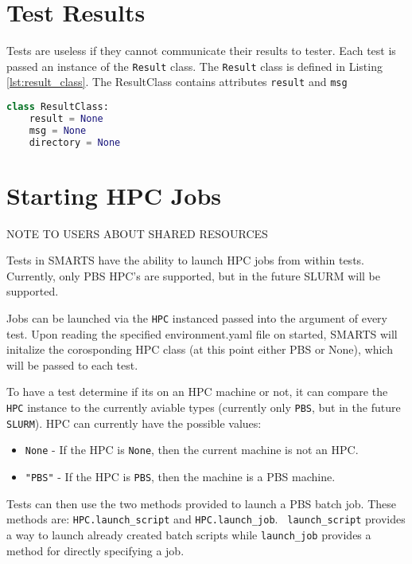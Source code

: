 \section{Test Results}
\label{sec:results}

Tests are useless if they cannot communicate their results to tester. Each test
is passed an instance of the {\tt Result} class. The {\tt Result} class is
defined in Listing \ref{lst:result_class}. The ResultClass contains attributes
{\tt result} and {\tt msg}

\begin{lstlisting}[language=Python, 
                   caption={Result class definition},
                   label={lst:result_class}]
class ResultClass:
    result = None
    msg = None
    directory = None
\end{lstlisting}

\section{Starting HPC Jobs}
\label{sec:hpc_jobs}

NOTE TO USERS ABOUT SHARED RESOURCES

Tests in SMARTS have the ability to launch HPC jobs from within tests.
Currently, only PBS HPC's are supported, but in the future SLURM will be
supported.

Jobs can be launched via the {\tt HPC} instanced passed into the argument of
every test. Upon reading the specified environment.yaml file on started, SMARTS
will initalize the corosponding HPC class (at this point either PBS or None),
which will be passed to each test.

To have a test determine if its on an HPC machine or not, it can compare the
{\tt HPC} instance to the currently aviable types (currently only {\tt PBS},
but in the future {\tt SLURM}). HPC can currently have the possible values:

\begin{itemize}
    \item {\tt None} - If the HPC is {\tt None}, then the current machine is
    not an HPC.
    \item {\tt "PBS"} - If the HPC is {\tt PBS}, then the machine is a PBS
    machine.
\end{itemize}

Tests can then use the two methods provided to launch a PBS batch job. These
methods are: {\tt HPC.launch\_script} and {\tt HPC.launch\_job}. {\tt
launch\_script} provides a way to launch already created batch scripts while
{\tt launch\_job} provides a method for directly specifying a job.

